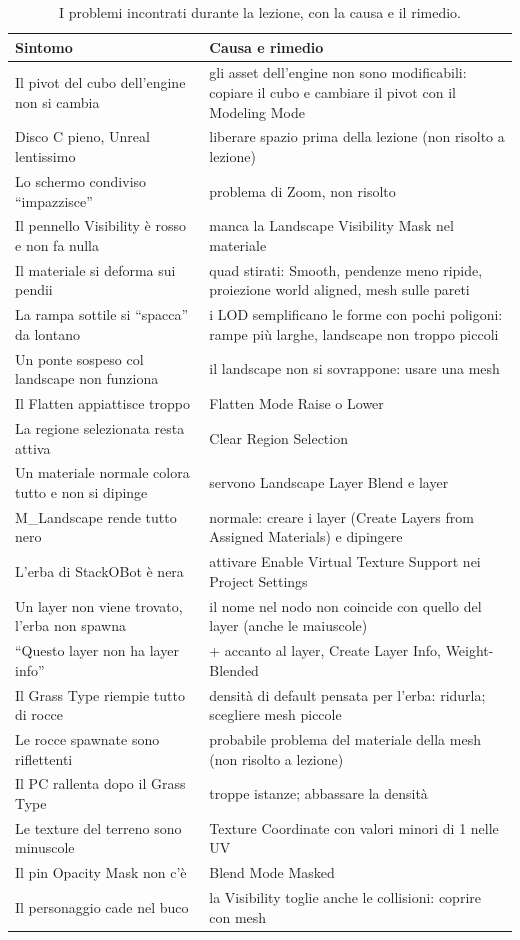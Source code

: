 \begin{table}[htbp]
\centering
\small
\begin{tabular}{@{}p{5.4cm}p{8.6cm}@{}}
\toprule
\textbf{Sintomo} & \textbf{Causa e rimedio} \\
\midrule
Il pivot del cubo dell'engine non si cambia & gli asset dell'engine non sono modificabili:
copiare il cubo e cambiare il pivot con il Modeling Mode \\
Disco C pieno, Unreal lentissimo & liberare spazio prima della lezione (non risolto a
lezione) \\
Lo schermo condiviso ``impazzisce'' & problema di Zoom, non risolto \\
Il pennello Visibility è rosso e non fa nulla & manca la Landscape Visibility Mask nel
materiale \\
Il materiale si deforma sui pendii & quad stirati: Smooth, pendenze meno ripide, proiezione
world aligned, mesh sulle pareti \\
La rampa sottile si ``spacca'' da lontano & i LOD semplificano le forme con pochi poligoni:
rampe più larghe, landscape non troppo piccoli \\
Un ponte sospeso col landscape non funziona & il landscape non si sovrappone: usare una
mesh \\
Il Flatten appiattisce troppo & Flatten Mode Raise o Lower \\
La regione selezionata resta attiva & Clear Region Selection \\
Un materiale normale colora tutto e non si dipinge & servono Landscape Layer Blend e layer \\
M\_Landscape rende tutto nero & normale: creare i layer (Create Layers from Assigned
Materials) e dipingere \\
L'erba di StackOBot è nera & attivare Enable Virtual Texture Support nei Project Settings \\
Un layer non viene trovato, l'erba non spawna & il nome nel nodo non coincide con quello
del layer (anche le maiuscole) \\
``Questo layer non ha layer info'' & + accanto al layer, Create Layer Info, Weight-Blended \\
Il Grass Type riempie tutto di rocce & densità di default pensata per l'erba: ridurla;
scegliere mesh piccole \\
Le rocce spawnate sono riflettenti & probabile problema del materiale della mesh (non
risolto a lezione) \\
Il PC rallenta dopo il Grass Type & troppe istanze; abbassare la densità \\
Le texture del terreno sono minuscole & Texture Coordinate con valori minori di 1 nelle UV \\
Il pin Opacity Mask non c'è & Blend Mode Masked \\
Il personaggio cade nel buco & la Visibility toglie anche le collisioni: coprire con mesh \\
\bottomrule
\end{tabular}
\caption{I problemi incontrati durante la lezione, con la causa e il rimedio.}
\label{ue14:tab:errori}
\end{table}

